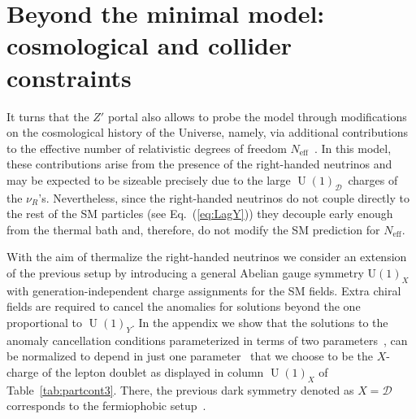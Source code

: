 \documentclass[12pt]{article}
\begin{document}
\section{Beyond the minimal model: cosmological and collider constraints}
\label{sec:CosmoConstraints}
It turns that the $Z'$ portal also allows to probe the model through modifications on the cosmological history of the Universe, namely, via additional contributions to the effective number of relativistic degrees of freedom $N_{\text{eff}}$~\cite{Dolgov:2002wy}. In this model, these contributions arise from the presence of the right-handed neutrinos and may be expected to be sizeable precisely due to the large $\operatorname{U}(1)_{\mathcal{D}}$~charges of the $\nu_R$'s.  Nevertheless, since the right-handed neutrinos do not couple directly to the rest of the SM particles (see Eq.~(\ref{eq:LagY}))  they  decouple early enough from the thermal bath and, therefore, do not modify the SM prediction for $N_{\text{eff}}$.

With the aim of thermalize the right-handed neutrinos we consider an extension of the previous setup by introducing a general Abelian gauge symmetry $\operatorname{U(1)}_X$ with generation-independent charge assignments for the SM fields. Extra chiral fields are required to cancel the anomalies for solutions beyond the one proportional to $\operatorname{U}(1)_Y$. In the appendix we show that the solutions to the anomaly cancellation conditions parameterized in terms
of two parameters~\cite{Appelquist:2002mw,Campos:2017dgc}, can be normalized to depend in just one parameter~\cite{Jenkins:1987ue,Oda:2015gna,Okada:2018tgy} that we choose to be the $X$-charge of the lepton doublet as displayed in column $\operatorname{U}(1)_X$ of Table~\ref{tab:partcont3}.
There, the previous dark symmetry denoted as $X=\mathcal{D}$ corresponds to the fermiophobic setup~\cite{Campos:2017dgc,Bertuzzo:2018itn,Bertuzzo:2018ftf}.
\end{document}
